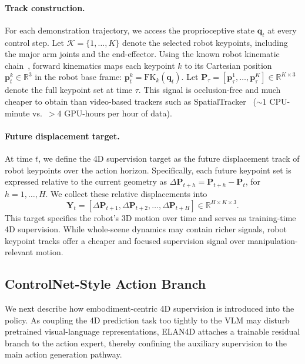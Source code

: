 \paragraph{Track construction.}
For each demonstration trajectory, we access the proprioceptive state \(\mathbf{q}_t\) at every control step. Let \(\mathcal{K}=\{1,\dots,K\}\) denote the selected robot keypoints, including the major arm joints and the end-effector. Using the known robot kinematic chain~\citep{craig2009introduction}, forward kinematics maps each keypoint \(k\) to its Cartesian position \(\mathbf{p}_{t}^{k}\in\mathbb{R}^{3}\) in the robot base frame: \(\mathbf{p}_{t}^{k} = \mathrm{FK}_{k}(\mathbf{q}_{t})\). Let \(\mathbf{P}_{\tau}=[\mathbf{p}_{\tau}^{1}, \dots, \mathbf{p}_{\tau}^{K}] \in \mathbb{R}^{K\times 3}\) denote the full keypoint set at time \(\tau\). This signal is occlusion-free and much cheaper to obtain than video-based trackers such as SpatialTracker~\citep{xiao2025spatialtracker} (\(\sim\!1\) CPU-minute vs.\ \(>\!4\) GPU-hours per hour of data).\vspace{-1em}

\paragraph{Future displacement target.}
At time \(t\), we define the 4D supervision target as the future displacement track of robot keypoints over the action horizon. Specifically, each future keypoint set is expressed relative to the current geometry as \(\Delta \mathbf{P}_{t+h} = \mathbf{P}_{t+h} - \mathbf{P}_{t}\), for \(h=1,\dots,H\). We collect these relative displacements into
\begin{equation}
    \mathbf{Y}_{t}
    =
    \left[
    \Delta \mathbf{P}_{t+1}, \Delta \mathbf{P}_{t+2}, \dots, \Delta \mathbf{P}_{t+H}
    \right]
    \in \mathbb{R}^{H\times K\times 3}.
    \label{eq:track-target}
\end{equation}
This target specifies the robot's 3D motion over time and serves as training-time 4D supervision. While whole-scene dynamics may contain richer signals, robot keypoint tracks offer a cheaper and focused supervision signal over manipulation-relevant motion.

\subsection{ControlNet-Style Action Branch}
\label{sec:control_branch}

We next describe how embodiment-centric 4D supervision is introduced into the policy. As coupling the 4D prediction task too tightly to the VLM may disturb pretrained visual-language representations, ELAN4D attaches a trainable residual branch to the action expert, thereby confining the auxiliary supervision to the main action generation pathway.\vspace{-1em}

